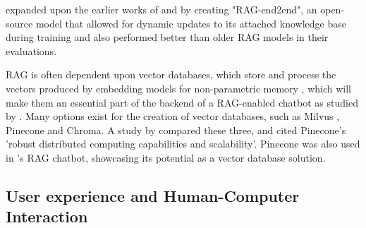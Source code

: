 \documentclass[12pt]{report}
\begin{document}
    \textcite{siriwardhana_improving_2023} expanded upon the earlier works of \textcite{karpukhin_dense_2020} and \textcite{lewis_pre-training_2020} by creating 
    "RAG-end2end", an open-source model that allowed for dynamic updates to its attached knowledge base during training and also performed better than older 
    RAG models in their evaluations.

    
    RAG is often dependent upon vector databases, which store and process the vectors produced by embedding models 
    for non-parametric memory \autocite{li_modernization_2023}, which will make them an essential part of the backend of 
    a RAG-enabled chatbot as studied by \textcite{odede_jaybot_2024}. Many options exist for the creation of 
    vector databases, such as Milvus \autocite{wang_milvus_2021}, Pinecone and Chroma. A study by 
    \textcite{xie_brief_2023} compared these three, and cited Pinecone's 'robust distributed computing capabilities and scalability'.
    Pinecone was also used in \textcite{odede_jaybot_2024}'s RAG chatbot, showcasing its potential as a vector database solution.
    
    


 


    \subsection{User experience and Human-Computer Interaction}
\end{document}
